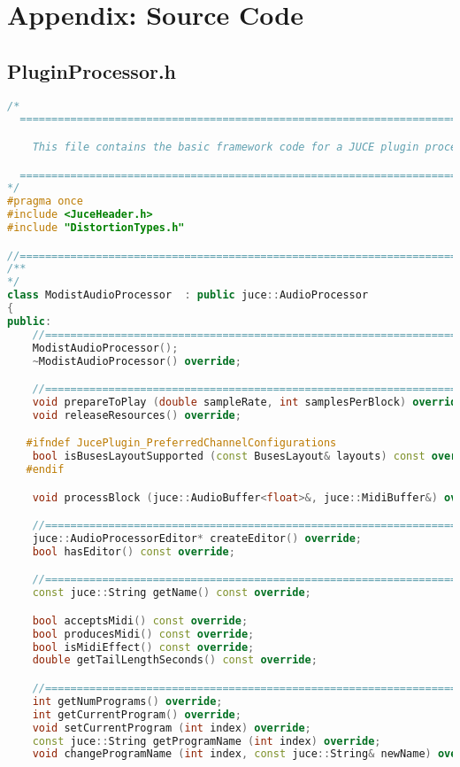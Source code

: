 \documentclass{article}
\begin{document}
\pagebreak


\section{Appendix: Source Code}
\begin{appendix}

\subsection{PluginProcessor.h}
\begin{lstlisting}[language=C++]
/*
  ==============================================================================

    This file contains the basic framework code for a JUCE plugin processor.

  ==============================================================================
*/
#pragma once
#include <JuceHeader.h>
#include "DistortionTypes.h"

//==============================================================================
/**
*/
class ModistAudioProcessor  : public juce::AudioProcessor
{
public:
    //==============================================================================
    ModistAudioProcessor();
    ~ModistAudioProcessor() override;

    //==============================================================================
    void prepareToPlay (double sampleRate, int samplesPerBlock) override;
    void releaseResources() override;

   #ifndef JucePlugin_PreferredChannelConfigurations
    bool isBusesLayoutSupported (const BusesLayout& layouts) const override;
   #endif

    void processBlock (juce::AudioBuffer<float>&, juce::MidiBuffer&) override;

    //==============================================================================
    juce::AudioProcessorEditor* createEditor() override;
    bool hasEditor() const override;

    //==============================================================================
    const juce::String getName() const override;

    bool acceptsMidi() const override;
    bool producesMidi() const override;
    bool isMidiEffect() const override;
    double getTailLengthSeconds() const override;

    //==============================================================================
    int getNumPrograms() override;
    int getCurrentProgram() override;
    void setCurrentProgram (int index) override;
    const juce::String getProgramName (int index) override;
    void changeProgramName (int index, const juce::String& newName) override;


\end{lstlisting}
\end{appendix}
\end{document}

